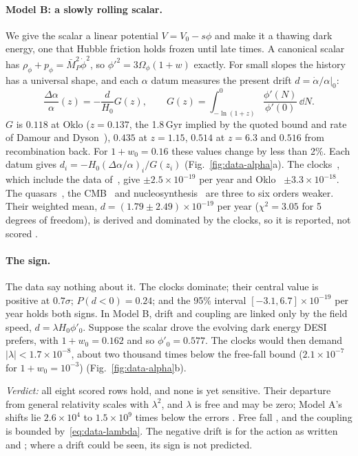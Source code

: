 \paragraph{Model B: a slowly rolling scalar.} We give the scalar a linear potential $V=V_0-s\phi$ and make it a thawing dark energy, one that
Hubble friction holds frozen until late times. A canonical scalar has $\rho_\phi+p_\phi=\bar M_P^2\dot\phi^2$, so $\phi'^2=3\Omega_\phi(1+w)$
exactly. For small slopes the history has a universal shape, and each $\alpha$ datum measures the present drift $d=\dot\alpha/\alpha|_0$:
\begin{equation}\label{eq:data-G}
\frac{\Delta\alpha}{\alpha}(z)=-\frac{d}{H_0}G(z),\qquad G(z)=\int_{-\ln(1+z)}^{0}\frac{\phi'(N)}{\phi'(0)}\,\dd N .
\end{equation}
$G$ is $0.118$ at Oklo ($z=0.137$, the 1.8\,Gyr implied by the quoted bound and rate of Damour and Dyson~\cite{damour1996}), $0.435$ at
$z=1.15$, $0.514$ at $z=6.3$ and $0.516$ from recombination back. For $1+w_0=0.16$ these values change by less than 2\%. Each datum gives
$d_i=-H_0(\Delta\alpha/\alpha)_i/G(z_i)$ (Fig.~\ref{fig:data-alpha}a). The clocks~\cite{filzinger2023}, which include the data of~\cite{lange},
give $\pm2.5\times10^{-19}$ per year and Oklo~\cite{davis2015} $\pm3.3\times10^{-18}$. The quasars~\cite{espresso,wilczynska2020}, the
CMB~\cite{hart2018} and nucleosynthesis~\cite{avelino2001} are three to six orders weaker. Their weighted mean, $d=(1.79\pm2.49)\times10^{-19}$
per year ($\chi^2=3.05$ for 5 degrees of freedom), is derived and dominated by the clocks, so it is reported, not scored .

\paragraph{The sign.} The data say nothing about it. The clocks dominate; their central value is positive at $0.7\sigma$; $P(d<0)=0.24$; and
the 95\% interval $[-3.1,6.7]\times10^{-19}$ per year holds both signs. In Model B, drift and coupling are linked only by the field speed,
$d=\lambda H_0\phi'_0$. Suppose the scalar drove the evolving dark energy DESI prefers, with $1+w_0=0.162$ and so $\phi'_0=0.577$. The clocks
would then demand $|\lambda|<1.7\times10^{-8}$, about two thousand times below the free-fall bound ($2.1\times10^{-7}$ for $1+w_0=10^{-3}$)
 (Fig.~\ref{fig:data-alpha}b).

\emph{Verdict:} all eight scored rows hold, and none is yet sensitive. Their departure from general relativity scales with $\lambda^2$, and
$\lambda$ is free and may be zero; Model A's shifts lie $2.6\times10^4$ to $1.5\times10^9$ times below the errors . Free fall ,
and the coupling is bounded by~\eqref{eq:data-lambda}. The negative drift is  for the action as written and ; where
a drift could be seen, its sign is not predicted.

